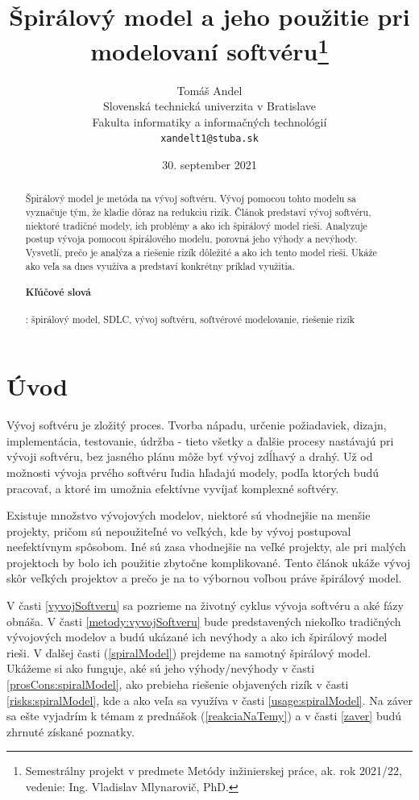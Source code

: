 \documentclass[10pt,twoside,slovak,a4paper]{article}
\title{Špirálový model a jeho použitie pri modelovaní softvéru\thanks{Semestrálny projekt v predmete Metódy inžinierskej práce, ak. rok 2021/22, vedenie: Ing. Vladislav Mlynarovič, PhD.}}
\author{Tomáš Andel\\[2pt]
	{\small Slovenská technická univerzita v Bratislave}\\
	{\small Fakulta informatiky a informačných technológií}\\
	{\small \texttt{xandelt1@stuba.sk}}
	}
\date{\small 30. september 2021}
\begin{document}
\maketitle

\begin{abstract}
Špirálový model je metóda na vývoj softvéru. Vývoj pomocou tohto modelu sa vyznačuje tým, že kladie dôraz na redukciu rizík. Článok predstaví vývoj softvéru, niektoré tradičné modely, ich problémy a ako ich špirálový model rieši. Analyzuje postup vývoja pomocou špirálového modelu, porovná jeho výhody a nevýhody. Vysvetlí, prečo je analýza a riešenie rizík dôležité a ako ich tento model rieši. Ukáže ako veľa sa dnes využíva a predstaví konkrétny príklad využitia.

\paragraph{Kľúčové slová}: špirálový model, SDLC, vývoj softvéru, softvérové modelovanie, riešenie rizík
\end{abstract}

\section{Úvod}

Vývoj softvéru je zložitý proces. Tvorba nápadu, určenie požiadaviek, dizajn, implementácia, testovanie, údržba - tieto všetky a ďalšie procesy nastávajú pri vývoji softvéru, bez jasného plánu môže byť vývoj zdĺhavý a drahý. Už od možnosti vývoja prvého softvéru ľudia hľadajú modely, podľa ktorých budú pracovať, a ktoré im umožnia efektívne vyvíjať komplexné softvéry.

Existuje množstvo vývojových modelov, niektoré sú vhodnejšie na menšie projekty, pričom sú nepoužiteľné vo veľkých, kde by vývoj postupoval neefektívnym spôsobom. Iné sú zasa vhodnejšie na veľké projekty, ale pri malých projektoch by bolo ich použitie zbytočne komplikované. Tento článok ukáže vývoj skôr veľkých projektov a prečo je na to výbornou voľbou práve špirálový model.

V časti \ref{vyvojSoftveru} sa pozrieme na životný cyklus vývoja softvéru a aké fázy obnáša. V časti \ref{metody:vyvojSoftveru} bude predstavených niekoľko tradičných vývojových modelov a budú ukázané ich nevýhody a ako ich špirálový model rieši. V ďalšej časti (\ref{spiralModel}) prejdeme na samotný špirálový model. Ukážeme si ako funguje, aké sú jeho výhody/nevýhody v časti \ref{prosCons:spiralModel}, ako prebieha riešenie objavených rizík v časti \ref{risks:spiralModel}, kde a ako veľa sa využíva v časti \ref{usage:spiralModel}. Na záver sa ešte vyjadrím k témam z prednášok (\ref{reakciaNaTemy}) a v časti \ref{zaver} budú zhrnuté získané poznatky.
\end{document}
